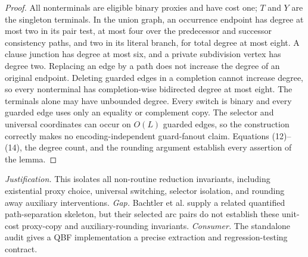 \documentclass{article}
\begin{document}
\begin{proof}
All nonterminals are eligible binary proxies and have cost one; \(T\) and \(Y\) are the singleton terminals.  In the union graph, an occurrence endpoint has degree at most two in its pair test, at most four over the predecessor and successor consistency paths, and two in its literal branch, for total degree at most eight.  A clause junction has degree at most six, and a private subdivision vertex has degree two.  Replacing an edge by a path does not increase the degree of an original endpoint.  Deleting guarded edges in a completion cannot increase degree, so every nonterminal has completion-wise bidirected degree at most eight.  The terminals alone may have unbounded degree.  Every switch is binary and every guarded edge uses only an equality or complement copy.  The selector and universal coordinates can occur on \(O(L)\) guarded edges, so the construction correctly makes no encoding-independent guard-fanout claim.  Equations (12)--(14), the degree count, and the rounding argument establish every assertion of the lemma.
\end{proof}
\par\smallskip\noindent \textit{Justification.} This isolates all non-routine reduction invariants, including existential proxy choice, universal switching, selector isolation, and rounding away auxiliary interventions. \textit{Gap.} Bachtler et al. supply a related quantified path-separation skeleton, but their selected arc pairs do not establish these unit-cost proxy-copy and auxiliary-rounding invariants. \textit{Consumer.} The standalone audit gives a QBF implementation a precise extraction and regression-testing contract.
\end{document}
